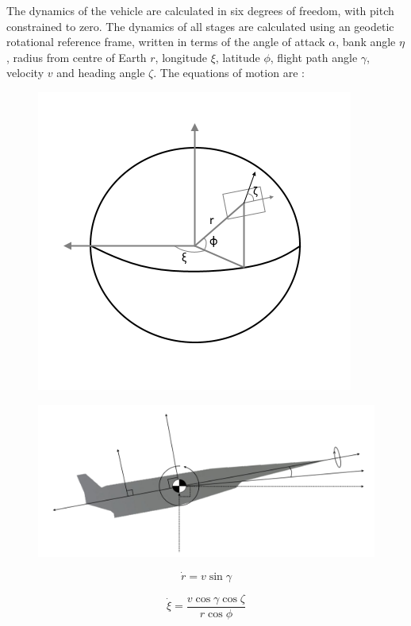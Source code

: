 The dynamics of the vehicle are calculated in six degrees of freedom, with pitch constrained to zero. 
The dynamics of all stages are calculated using an geodetic rotational reference frame, written in terms of the angle of attack $\alpha$, bank angle $\eta$, radius from centre of Earth $r$, longitude $\xi$, latitude $\phi$, flight path angle $\gamma$, velocity $v$ and heading angle $\zeta$. The equations of motion are \cite{Josselyn2002a}:
\begin{figure}
\centering
\includegraphics[width=0.7\linewidth]{figures/4_LODESTAR/global}
\caption{}
\label{fig:global}
\end{figure}
\begin{figure}
\centering
\includegraphics[width=0.9\linewidth]{figures/4_LODESTAR/Axes}
\caption{}
\label{fig:Axes}
\end{figure}


\begin{equation}
\dot{r} = v \sin \gamma
\end{equation}

\begin{equation}
\dot{\xi} = \frac{v\cos \gamma \cos \zeta}{r \cos \phi}
\end{equation}

